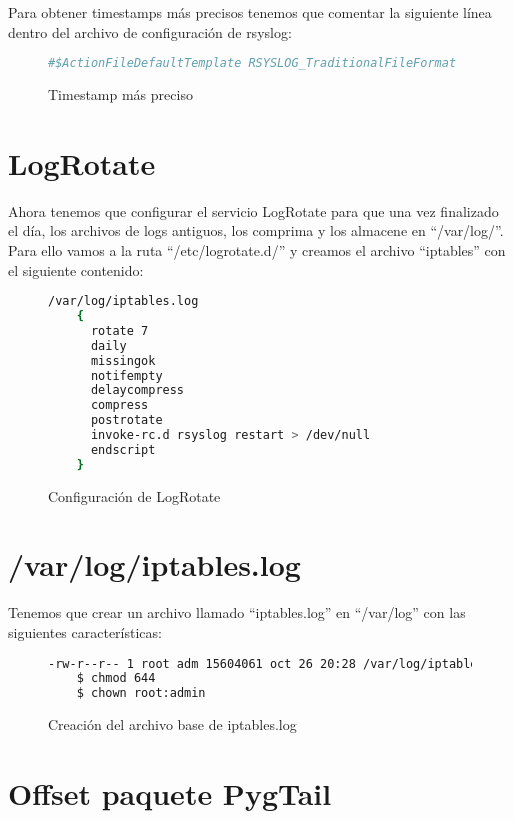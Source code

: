 Para obtener timestamps más precisos tenemos que comentar la siguiente línea dentro del archivo de configuración de rsyslog:

\begin{figure}[H]
  \begin{lstlisting}[language=bash]
    #$ActionFileDefaultTemplate RSYSLOG_TraditionalFileFormat
  \end{lstlisting}
  \caption{Timestamp más preciso}
\end{figure}

\section{LogRotate}

Ahora tenemos que configurar el servicio LogRotate para que una vez finalizado el día, los archivos de logs antiguos, los comprima y los almacene en ``/var/log/''. Para ello vamos a la ruta ``/etc/logrotate.d/'' y creamos el archivo ``iptables'' con el siguiente contenido:

\begin{figure}[H]
  \begin{lstlisting}[language=bash]
    /var/log/iptables.log
    {
      rotate 7
      daily
      missingok
      notifempty
      delaycompress
      compress
      postrotate
      invoke-rc.d rsyslog restart > /dev/null
      endscript
    }
  \end{lstlisting}
  \caption{Configuración de LogRotate}
\end{figure}

\section{/var/log/iptables.log}

Tenemos que crear un archivo llamado ``iptables.log'' en ``/var/log'' con las siguientes características:

\begin{figure}[H]
  \begin{lstlisting}[language=bash]
    -rw-r--r-- 1 root adm 15604061 oct 26 20:28 /var/log/iptables.log
    $ chmod 644
    $ chown root:admin
  \end{lstlisting}
  \caption{Creación del archivo base de iptables.log}
\end{figure}

\section{Offset paquete PygTail}

